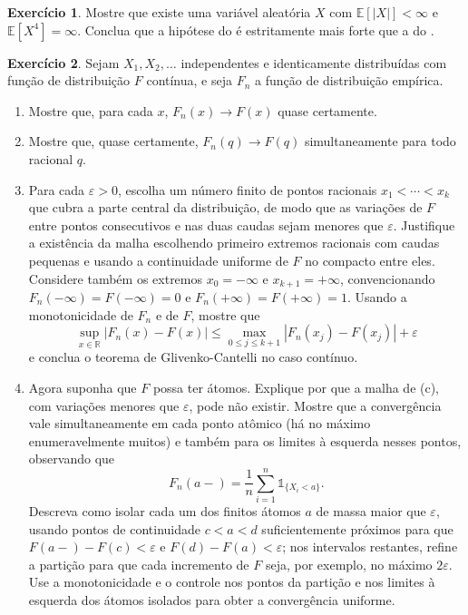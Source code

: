 \documentclass[12pt,portuguese]{article}
\theoremstyle{definition}
\theoremstyle{plainexercise}
\newtheorem{exercise}{Exercício}
\theoremstyle{starredexercise}
\newtheorem{starredexercise}[exercise]{Exercício}
\theoremstyle{definition}
\begin{document}
\begin{exercise}\label{exercise:momento-quatro}
Mostre que existe uma variável aleatória $X$ com $\mathbb{E}[|X|]<\infty$ e
$\mathbb{E}[X^4]=\infty$. Conclua que a hipótese do
 é estritamente mais forte que a do
.
\end{exercise}

\begin{starredexercise}\label{exercise:glivenko}
Sejam $X_1,X_2,\ldots$ independentes e identicamente distribuídas com função de
distribuição $F$ contínua, e seja $F_n$ a função de distribuição empírica.
\begin{enumerate}
\item[(a)] Mostre que, para cada $x$, $F_n(x)\to F(x)$ quase certamente.
\item[(b)] Mostre que, quase certamente, $F_n(q)\to F(q)$ simultaneamente para
todo racional $q$.
\item[(c)] Para cada $\varepsilon>0$, escolha um número finito de pontos
racionais $x_1<\cdots<x_k$ que cubra a parte central da distribuição, de modo
que as variações de $F$ entre pontos consecutivos e nas duas caudas sejam
menores que $\varepsilon$. Justifique a existência da malha escolhendo
primeiro extremos racionais com caudas pequenas e usando a continuidade
uniforme de $F$ no compacto entre eles. Considere também os extremos
$x_0=-\infty$ e $x_{k+1}=+\infty$, convencionando $F_n(-\infty)=F(-\infty)=0$ e
$F_n(+\infty)=F(+\infty)=1$. Usando a monotonicidade de $F_n$ e de $F$, mostre
que
\[
\sup_{x\in\mathbb{R}}|F_n(x)-F(x)|\leqslant
\max_{0\leqslant j\leqslant k+1}|F_n(x_j)-F(x_j)|+\varepsilon
\]
e conclua o teorema de Glivenko-Cantelli no caso contínuo.
\item[(d)] Agora suponha que $F$ possa ter átomos. Explique por que a malha de
(c), com variações menores que $\varepsilon$, pode não existir. Mostre que a
convergência vale simultaneamente em cada ponto atômico (há no máximo
enumeravelmente muitos) e também para os limites à esquerda nesses pontos,
observando que
\[
F_n(a-)=\frac{1}{n}\sum_{i=1}^{n}\mathds{1}_{\{X_i<a\}}.
\]
Descreva como isolar cada um dos finitos átomos $a$ de massa maior que
$\varepsilon$, usando pontos de continuidade $c<a<d$ suficientemente próximos
para que $F(a-)-F(c)<\varepsilon$ e $F(d)-F(a)<\varepsilon$; nos intervalos
restantes, refine a partição para que cada incremento de $F$ seja, por exemplo,
no máximo $2\varepsilon$. Use a monotonicidade e o controle nos pontos da
partição e nos limites à esquerda dos átomos isolados para obter a
convergência uniforme.
\end{enumerate}
\end{starredexercise}
\end{document}

